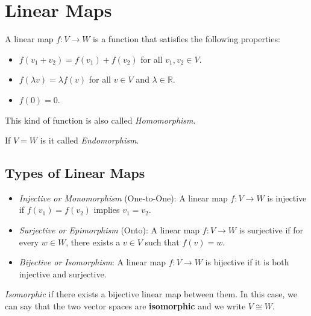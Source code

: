 \newpage
\section{Linear Maps}
A linear map \( f: V \to W \) is a function that satisfies the following properties:

\begin{itemize}[label=\(-\)]
    \item \( f(v_1 + v_2) = f(v_1) + f(v_2) \) for all \( v_1, v_2 \in V \).
    \item \( f(\lambda v) = \lambda f(v) \) for all \( v \in V \) and \( \lambda \in \mathbb{R} \).
    \item \( f(0) = 0 \).
\end{itemize} 

 This kind of function is also called \emph{Homomorphism}.

 If \(V = W\) is it called \emph{Endomorphism}.

\subsection{Types of Linear Maps}

\begin{itemize}[label=\(-\)]
    \item \emph{Injective or Monomorphism} (One-to-One): A linear map \( f: V \to W \) is injective if \( f(v_1) = f(v_2) \) implies \( v_1 = v_2 \).
    \item \emph{Surjective or Epimorphism} (Onto): A linear map \( f: V \to W \) is surjective if for every \( w \in W \), there exists a \( v \in V \) such that \( f(v) = w \).
    \item \emph{Bijective or Isomorphism}: A linear map \( f: V \to W \) is bijective if it is both injective and surjective.
\end{itemize}

\emph{Isomorphic} if there exists a bijective linear 
map between them. In this case, we can say that the two vector spaces are \textbf{isomorphic} and we write \( V \cong W \).

